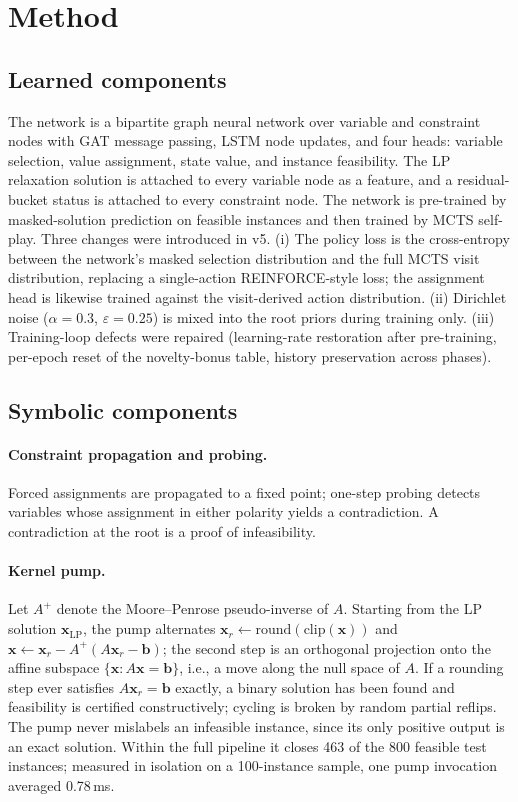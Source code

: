 \documentclass[12pt]{article}
\begin{document}
\section{Method}

\subsection{Learned components}

The network is a bipartite graph neural network over variable and constraint nodes with GAT message passing, LSTM node updates, and four heads: variable selection, value assignment, state value, and instance feasibility. The LP relaxation solution is attached to every variable node as a feature, and a residual-bucket status is attached to every constraint node. The network is pre-trained by masked-solution prediction on feasible instances and then trained by MCTS self-play. Three changes were introduced in v5. (i) The policy loss is the cross-entropy between the network's masked selection distribution and the full MCTS visit distribution, replacing a single-action REINFORCE-style loss; the assignment head is likewise trained against the visit-derived action distribution. (ii) Dirichlet noise ($\alpha = 0.3$, $\varepsilon = 0.25$) is mixed into the root priors during training only. (iii) Training-loop defects were repaired (learning-rate restoration after pre-training, per-epoch reset of the novelty-bonus table, history preservation across phases).

\subsection{Symbolic components}

\paragraph{Constraint propagation and probing.} Forced assignments are propagated to a fixed point; one-step probing detects variables whose assignment in either polarity yields a contradiction. A contradiction at the root is a proof of infeasibility.

\paragraph{Kernel pump.} Let $A^{+}$ denote the Moore--Penrose pseudo-inverse of $A$. Starting from the LP solution $\mathbf{x}_{\mathrm{LP}}$, the pump alternates $\mathbf{x}_r \leftarrow \mathrm{round}(\mathrm{clip}(\mathbf{x}))$ and $\mathbf{x} \leftarrow \mathbf{x}_r - A^{+}(A\mathbf{x}_r - \mathbf{b})$; the second step is an orthogonal projection onto the affine subspace $\{\mathbf{x} : A\mathbf{x}=\mathbf{b}\}$, i.e., a move along the null space of $A$. If a rounding step ever satisfies $A\mathbf{x}_r = \mathbf{b}$ exactly, a binary solution has been found and feasibility is certified constructively; cycling is broken by random partial reflips. The pump never mislabels an infeasible instance, since its only positive output is an exact solution. Within the full pipeline it closes 463 of the 800 feasible test instances; measured in isolation on a 100-instance sample, one pump invocation averaged 0.78\,ms.
\end{document}
